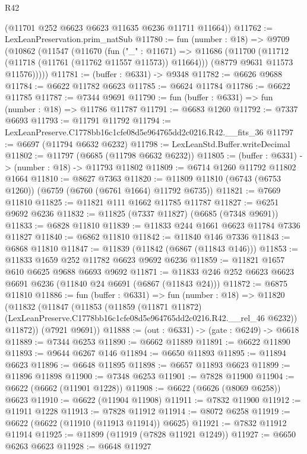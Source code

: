 \begin{lexlean}{R42}
\begin{coremodule}
{      (@11701 @252 @6623 @6623 @11635 @6236 @11711 @11664))
@11762 := LexLeanPreservation.prim_natSub
@11780 := fun (number : @18) =>
  @9709
    (@10862
      (@11547
        (@11670
          (fun ("_" : @11671) =>
          @11686
            (@11700 (@11712 (@11718 (@11761 (@11762 @11557 @11573)) @11664)))
            (@8779 @9631 @11573 @11576)))))
@11781 := (buffer : @6331) -> @9348
@11782 := @6626 @9688
@11784 := @6622 @11782 @6623
@11785 := @6624 @11784
@11786 := @6622 @11785
@11787 := @7344 @9691
@11790 := fun (buffer : @6331) => fun (number : @18) => @11786 @11787
@11791 := @6683 @1260
@11792 := @7337 @6693
@11793 := @11791 @11792
@11794 := LexLeanPreserve.C1778bb16c1cfe08d5e964765dd2c0216.R42.__fits_36
@11797 := @6697 (@11794 @6632 @6232)
@11798 := LexLeanStd.Buffer.writeDecimal
@11802 := @11797 (@6685 (@11798 @6632 @6232))
@11805 := (buffer : @6331) -> (number : @18) -> @11793 @11802
@11809 := @6714 @1260 @11792 @11802 @1664
@11810 := @8627 @7363
@11820 := @11809 @11810 (@6743 (@6753 @1260)) (@6759 (@6760 (@6761 @1664) @11792 @6735))
@11821 := @7669 @11810
@11825 := @11821 @111 @1662 @11785 @11787
@11827 := @6251 @9692 @6236
@11832 := @11825 (@7337 @11827) (@6685 (@7348 @9691))
@11833 := @6828 @11810
@11839 := @11833 @244 @1661 @6623 @11784 @7336 @11827
@11840 := @6862 @11810
@11842 := @11840 @146 @7336
@11843 := @6868 @11810
@11847 := @11839 (@11842 (@6867 (@11843 @146)))
@11853 := @11833 @1659 @252 @11782 @6623 @9692 @6236
@11859 := @11821 @1657 @610 @6625 @9688 @6693 @9692
@11871 := @11833 @246 @252 @6623 @6623 @6691 @6236 (@11840 @24 @6691 (@6867 (@11843 @24)))
@11872 := @6875 @11810
@11886 := fun (buffer : @6331) =>
  fun (number : @18) =>
  @11820
    (@11832
      (@11847
        (@11853
          (@11859
            (@11871 @11872)
            (LexLeanPreserve.C1778bb16c1cfe08d5e964765dd2c0216.R42.__rel_46 @6232))
          @11872))
      (@7921 @9691))
@11888 := (out : @6331) -> (gate : @6249) -> @6618
@11889 := @7344 @6253
@11890 := @6662 @11889
@11891 := @6622 @11890
@11893 := @9644 @6267 @146
@11894 := @6650 @11893
@11895 := @11894 @6623
@11896 := @6648 @11895
@11898 := @6657 @11893 @6623
@11899 := @11896 @11898
@11900 := @7348 @6253
@11901 := @7828 @11900
@11904 := @6622 (@6662 (@11901 @1228))
@11908 := @6622 (@6626 (@8069 @6258)) @6623
@11910 := @6622 (@11904 @11908)
@11911 := @7832 @11900
@11912 := @11911 @1228
@11913 := @7828 @11912
@11914 := @8072 @6258
@11919 := @6622 (@6622 (@11910 (@11913 @11914)) @6625)
@11921 := @7832 @11912 @11914
@11925 := @11899 (@11919 (@7828 @11921 @1249))
@11927 := @6650 @6263 @6623
@11928 := @6648 @11927
}
\end{coremodule}
\end{lexlean}
